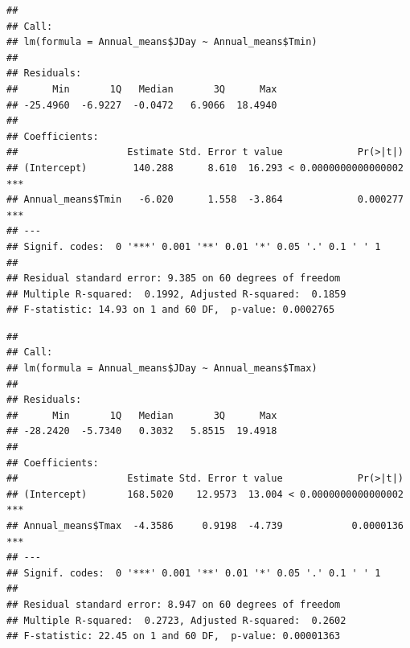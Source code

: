 \documentclass[
]{book}
\newenvironment{Shaded}{\begin{snugshade}}{\end{snugshade}}
\newcommand{\KeywordTok}[1]{\textcolor[rgb]{0.13,0.29,0.53}{\textbf{#1}}}
\newcommand{\NormalTok}[1]{#1}
\newcommand{\OperatorTok}[1]{\textcolor[rgb]{0.81,0.36,0.00}{\textbf{#1}}}
\newcommand{\StringTok}[1]{\textcolor[rgb]{0.31,0.60,0.02}{#1}}
\begin{document}
\begin{verbatim}
## 
## Call:
## lm(formula = Annual_means$JDay ~ Annual_means$Tmin)
## 
## Residuals:
##      Min       1Q   Median       3Q      Max 
## -25.4960  -6.9227  -0.0472   6.9066  18.4940 
## 
## Coefficients:
##                   Estimate Std. Error t value             Pr(>|t|)    
## (Intercept)        140.288      8.610  16.293 < 0.0000000000000002 ***
## Annual_means$Tmin   -6.020      1.558  -3.864             0.000277 ***
## ---
## Signif. codes:  0 '***' 0.001 '**' 0.01 '*' 0.05 '.' 0.1 ' ' 1
## 
## Residual standard error: 9.385 on 60 degrees of freedom
## Multiple R-squared:  0.1992, Adjusted R-squared:  0.1859 
## F-statistic: 14.93 on 1 and 60 DF,  p-value: 0.0002765
\end{verbatim}

\begin{Shaded}
\end{Shaded}

\begin{verbatim}
## 
## Call:
## lm(formula = Annual_means$JDay ~ Annual_means$Tmax)
## 
## Residuals:
##      Min       1Q   Median       3Q      Max 
## -28.2420  -5.7340   0.3032   5.8515  19.4918 
## 
## Coefficients:
##                   Estimate Std. Error t value             Pr(>|t|)    
## (Intercept)       168.5020    12.9573  13.004 < 0.0000000000000002 ***
## Annual_means$Tmax  -4.3586     0.9198  -4.739            0.0000136 ***
## ---
## Signif. codes:  0 '***' 0.001 '**' 0.01 '*' 0.05 '.' 0.1 ' ' 1
## 
## Residual standard error: 8.947 on 60 degrees of freedom
## Multiple R-squared:  0.2723, Adjusted R-squared:  0.2602 
## F-statistic: 22.45 on 1 and 60 DF,  p-value: 0.00001363
\end{verbatim}

\begin{Shaded}
\end{Shaded}
\end{document}
